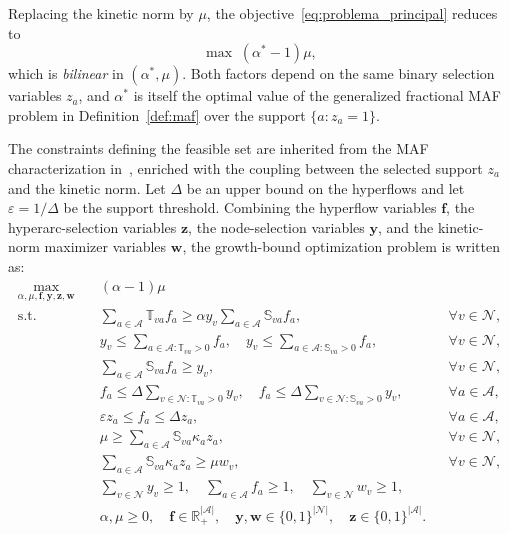 \documentclass[a4paper,11pt,reqno]{amsart}
\begin{document}
Replacing the kinetic norm by $\mu$, the objective~\eqref{eq:problema_principal}
reduces to
\begin{equation}
  \max\;(\alpha^*-1)\mu,
  \label{eq:obj_bilineal}
\end{equation}
which is \emph{bilinear} in $(\alpha^*,\mu)$. Both factors depend on the same
binary selection variables $z_a$, and $\alpha^*$ is itself the optimal value of
the generalized fractional MAF problem in Definition~\ref{def:maf} over the
support $\{a:z_a=1\}$.

The constraints defining the feasible set are inherited from the MAF characterization in~\citep{gonzalez2024maf}, enriched with the coupling between the selected support $z_a$ and the kinetic norm. Let $\Delta$ be an upper bound on the hyperflows and let $\varepsilon=1/\Delta$ be the support threshold. Combining the hyperflow variables $\mathbf f$, the hyperarc-selection variables $\mathbf z$, the node-selection variables $\mathbf y$, and the kinetic-norm maximizer variables $\mathbf w$, the growth-bound optimization problem is written as:
\begin{align}
  \max_{\alpha,\mu,\mathbf f,\mathbf y,\mathbf z,\mathbf w}\quad
  &(\alpha-1)\mu
  \tag{P}\label{eq:problema_completo}\\
  \text{s.t.}\quad
  &\sum_{a\in\mathcal A}\mathbb{T}_{va}f_a
  \geq
  \alpha y_v\sum_{a\in\mathcal A}\mathbb{S}_{va}f_a,
  && \forall v\in\mathcal N,
  \label{eq:P-amp}\\[2pt]
  &y_v \leq
  \sum_{a\in\mathcal A:\mathbb{T}_{va}>0} f_a,\quad
  y_v \leq
  \sum_{a\in\mathcal A:\mathbb{S}_{va}>0} f_a,
  && \forall v\in\mathcal N,
  \label{eq:P-auto}\\[2pt]
  &\sum_{a\in\mathcal A}\mathbb{S}_{va}f_a \geq y_v,
  && \forall v\in\mathcal N,
  \label{eq:P-cons}\\[2pt]
  &f_a \leq
  \Delta\sum_{v\in\mathcal N:\mathbb{T}_{va}>0} y_v,\quad
  f_a \leq
  \Delta\sum_{v\in\mathcal N:\mathbb{S}_{va}>0} y_v,
  && \forall a\in\mathcal A,
  \label{eq:P-link}\\[2pt]
  &\varepsilon z_a \leq f_a \leq \Delta z_a,
  && \forall a\in\mathcal A,
  \label{eq:P-supp}\\[2pt]
  &\mu \geq
  \sum_{a\in\mathcal A}\mathbb{S}_{va}\kappa_a z_a,
  && \forall v\in\mathcal N,
  \label{eq:P-sup}\\[2pt]
  &\sum_{a\in\mathcal A}\mathbb{S}_{va}\kappa_a z_a
  \geq \mu w_v,
  && \forall v\in\mathcal N,
  \label{eq:P-inf}\\[2pt]
  &\sum_{v\in\mathcal N} y_v \geq 1,\quad
  \sum_{a\in\mathcal A} f_a \geq 1,\quad
  \sum_{v\in\mathcal N} w_v \geq 1,
  \label{eq:P-norm}\\[2pt]
  &\alpha,\mu\geq 0,\quad
  \mathbf f\in\mathbb R_+^{|\mathcal A|},\quad
  \mathbf y,\mathbf w\in\{0,1\}^{|\mathcal N|},\quad
  \mathbf z\in\{0,1\}^{|\mathcal A|}.
  \nonumber
\end{align}
\end{document}
